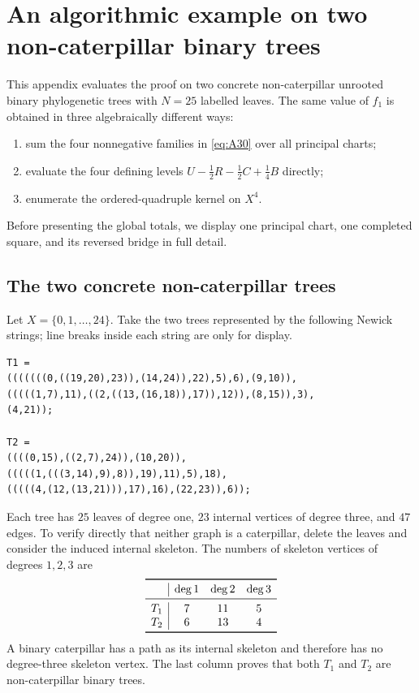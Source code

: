 \section{An algorithmic example on two non-caterpillar binary trees}
\label{app:algorithmic-reverse-calculation}

This appendix evaluates the proof on two concrete non-caterpillar unrooted
binary phylogenetic trees with $N=25$ labelled leaves.  The same value of
$f_1$ is obtained in three algebraically different ways:
\begin{enumerate}[label=\textup{(\roman*)}]
\item sum the four nonnegative families in \eqref{eq:A30} over all principal charts;
\item evaluate the four defining levels $U-\frac12R-\frac12C+\frac14B$ directly;
\item enumerate the ordered-quadruple kernel on $X^4$.
\end{enumerate}
Before presenting the global totals, we display one principal chart, one completed
square, and its reversed bridge in full detail.

\subsection{The two concrete non-caterpillar trees}

Let $X=\{0,1,\ldots,24\}$.  Take the two trees represented by the following
Newick strings; line breaks inside each string are only for display.
\begin{verbatim}
T1 =
(((((((0,((19,20),23)),(14,24)),22),5),6),(9,10)),
(((((1,7),11),((2,((13,(16,18)),17)),12)),(8,15)),3),
(4,21));

T2 =
((((0,15),((2,7),24)),(10,20)),
(((((1,(((3,14),9),8)),19),11),5),18),
(((((4,(12,(13,21))),17),16),(22,23)),6));
\end{verbatim}
Each tree has $25$ leaves of degree one, $23$ internal vertices of degree
three, and $47$ edges.  To verify directly that neither graph is a
caterpillar, delete the leaves and consider the induced internal skeleton.
The numbers of skeleton vertices of degrees $1,2,3$ are
\[
\begin{array}{c|ccc}
\toprule
&\deg 1&\deg 2&\deg 3\\
\midrule
T_1&7&11&5\\
T_2&6&13&4\\
\bottomrule
\end{array}
\]
A binary caterpillar has a path as its internal skeleton and therefore has no
degree-three skeleton vertex.  The last column proves that both $T_1$ and
$T_2$ are non-caterpillar binary trees.

